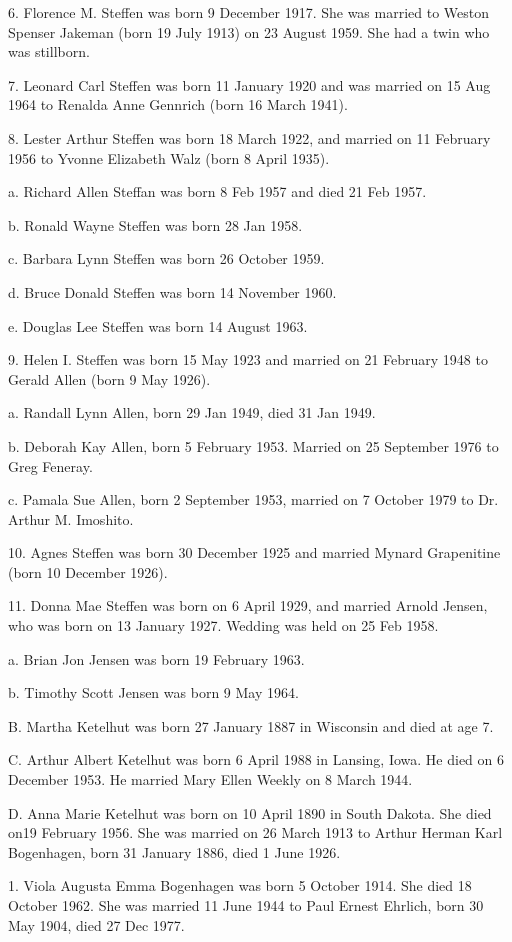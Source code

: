 \documentclass[a4paper]{article}
\begin{document}
6. Florence M. Steffen was born 9 December 1917.  She was married to Weston Spenser Jakeman (born 19 July 1913)  on 23 August 1959.  She  had a twin who was stillborn.

7. Leonard Carl Steffen was born 11 January 1920 and was married on 15 Aug 1964 to Renalda Anne Gennrich (born 16 March 1941).

8. Lester Arthur Steffen was born 18 March 1922, and married on 11 February 1956 to Yvonne Elizabeth Walz (born 8 April 1935).

a. Richard Allen Steffan was born 8 Feb 1957 and died 21 Feb 1957.

b. Ronald Wayne Steffen was born 28 Jan 1958.

c. Barbara Lynn Steffen was born 26 October 1959.

d. Bruce Donald Steffen was born 14 November 1960.

e. Douglas Lee Steffen was born 14 August 1963.

9. Helen I. Steffen was born 15 May 1923 and married on 21 February 1948 to Gerald Allen (born 9 May 1926).

a. Randall Lynn Allen, born 29 Jan 1949, died 31 Jan 1949.

b. Deborah Kay Allen, born 5 February 1953.  Married on 25 September 1976 to  Greg Feneray.

c.  Pamala Sue Allen, born 2 September 1953, married on 7 October 1979 to Dr. Arthur M. Imoshito.

10. Agnes Steffen was born 30 December 1925 and married Mynard Grapenitine (born 10 December 1926).

11. Donna Mae Steffen was born on 6 April 1929, and married Arnold Jensen, who was born on 13 January 1927.  Wedding was held on 25 Feb 1958. 

a. Brian Jon Jensen was born 19 February 1963.

b. Timothy Scott Jensen was born 9 May 1964.

B. Martha Ketelhut was born 27 January 1887 in Wisconsin and died at age 7.

C. Arthur Albert Ketelhut was born 6 April 1988 in Lansing, Iowa.  He died on 6 December 1953.  He married Mary Ellen Weekly on 8 March 1944.

D.  Anna Marie Ketelhut was born on 10 April 1890 in South Dakota.  She died on19 February 1956.  She was married on 26 March 1913 to Arthur Herman Karl Bogenhagen, born 31 January 1886, died 1 June 1926.

1. Viola Augusta Emma Bogenhagen was born 5 October 1914.  She died 18 October 1962.  She was married 11 June 1944 to Paul Ernest Ehrlich, born 30 May 1904, died 27 Dec 1977.
\end{document}
